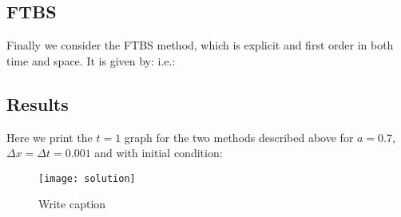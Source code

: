 \documentclass[10pt]{article}
\begin{document}
\iffalse
\subsection{BTBS}

The BTBS scheme is reported in \cite{MPE} as having first-order accuracy in both time and space and like CNCS is an implicit method. It is given by:
\eq{
	u^{m+1}_{n} = u^{m}_{n} - c\lrb{u^{m+1}_{n} - u^{m+1}_{n-1}}
}
Using the same boundary and initial conditions as above, we re-write this as:
\eq{
	u^{m+1} = C^{-1}u^{m}
}
Where:
\eq{
	C_{nk}  =  \delta_{nk} + c(\delta_{nk} - \delta_{(n-1)k})
}

\subsection{CTCS}

We consider also the second-order accurate explicit CTCS method:
\eq{
	u^{m+1}_{n} = u^{m-1}_{n} - c(u^{m}_{n+1} - u^{m}_{n-1})
}
This is a two-step method so we use FTCS for the first iteration:
\eq{
	u^{1}_{n} = u^{0}_{n} - \tfrac{c}{2}(u^{0}_{n+1} - u^{0}_{n-1})
}
Thus we have overall:
\algn{
	u^{1} & = Du^{0}\\
	u^{m+1} & = u^{m-1} + Eu^{m} \qquad \text{for}\; m = 1,...,M-1
}
Where:
\algn{
	D_{nk} & = \delta_{nk} - \tfrac{c}{2}(\delta_{(n+1)k} - \delta_{(n-1)k}) \\
	E_{nk} & = -c(\delta_{(n+1)k} - \delta_{(n-1)k})
}

\fi

\subsection{FTBS}

Finally we consider the FTBS method, which is explicit and first order in both time and space. It is given by:
i.e.:

\subsection{Results}

Here we print the $t=1$ graph for the two methods described above for $a = 0.7$, $\Delta x = \Delta t = 0.001$ and with initial condition: 


\begin{figure}[H]
\centering
\texttt{[image: solution]}
\caption{Write caption}
\end{figure}
\end{document}
